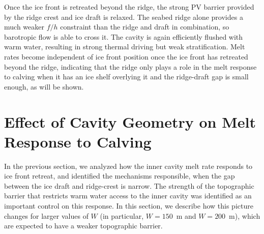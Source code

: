 \documentclass[draft]{agujournal2019}
\begin{document}
Once the ice front is retreated beyond the ridge, the strong PV barrier provided by the ridge crest and ice draft is relaxed. The seabed ridge alone provides a much weaker $f/h$ constraint than the ridge and draft in combination, so barotropic flow is able to cross it. The cavity is again efficiently flushed with warm water, resulting in strong thermal driving but weak stratification. Melt rates become independent of ice front position once the ice front has retreated beyond the ridge, indicating that the ridge only plays a role in the melt response to calving when it has an ice shelf overlying it and the ridge-draft gap is small enough, as will be shown.

\section{Effect of Cavity Geometry on Melt Response to Calving}\label{S:Results:H}
In the previous section, we analyzed how the inner cavity melt rate responds to ice front retreat, and identified the mechanisms responsible, when the gap between the ice draft and ridge-crest is narrow. The strength of the topographic barrier that restricts warm water access to the inner cavity was identified as an important control on this response. In this section, we describe how this picture changes for larger values of $W$ (in particular, $W=150$~m and $W=200$~m), which are expected to have a weaker topographic barrier.

\end{document}
